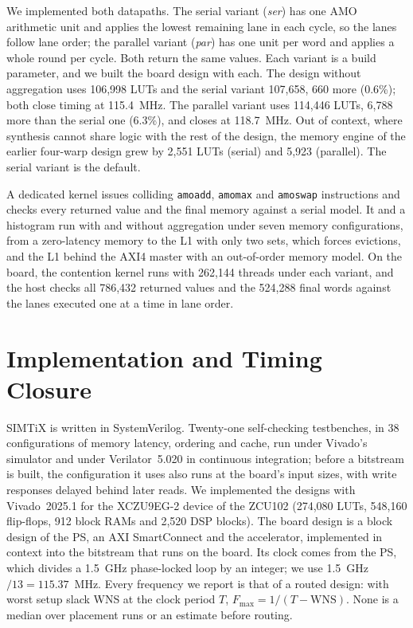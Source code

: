 \documentclass[journal]{IEEEtran}
\newcommand{\Fmax}{$F_{\max}$}
\begin{document}
We implemented both datapaths. The serial variant (\emph{ser}) has one AMO
arithmetic unit and applies the lowest remaining lane in each cycle, so the lanes
follow lane order; the parallel variant (\emph{par}) has one unit per word and
applies a whole round per cycle. Both return the same values. Each variant is a
build parameter, and we built the board design with each. The design without
aggregation uses 106,998 LUTs and the serial variant 107,658, 660 more (0.6\%);
both close timing at 115.4~MHz. The parallel variant uses 114,446 LUTs, 6,788
more than the serial one (6.3\%), and closes at 118.7~MHz. Out of context, where synthesis cannot share logic with the rest of
the design, the memory engine of the earlier four-warp design grew by 2,551 LUTs
(serial) and 5,923 (parallel). The serial variant is the default.

A dedicated kernel issues colliding \texttt{amoadd}, \texttt{amomax} and
\texttt{amoswap} instructions and checks every returned value and the final memory
against a serial model. It and a histogram run with and without aggregation under
seven memory configurations, from a zero-latency memory to the L1 with only two
sets, which forces evictions, and the L1 behind the AXI4 master with an
out-of-order memory model. On the board, the contention kernel runs with 262,144
threads under each variant, and the host checks all 786,432 returned values and
the 524,288 final words against the lanes executed one at a time in lane order.

\section{Implementation and Timing Closure}\label{sec:impl}
SIMTiX is written in SystemVerilog. Twenty-one self-checking testbenches, in 38
configurations of memory latency, ordering and cache, run under Vivado's simulator
and under Verilator~5.020 in continuous integration; before a bitstream is built,
the configuration it uses also runs at the board's input sizes, with write
responses delayed behind later reads. We implemented the designs with
Vivado~2025.1 for the XCZU9EG-2 device of the ZCU102 (274,080 LUTs, 548,160
flip-flops, 912 block RAMs and 2,520 DSP blocks). The board design is a block
design of the PS, an AXI SmartConnect and the accelerator, implemented in context
into the bitstream that runs on the board. Its clock comes from the PS, which
divides a 1.5~GHz phase-locked loop by an integer; we use 1.5~GHz$/13 =
115.37$~MHz. Every frequency we report is that of a routed design: with worst
setup slack WNS at the clock period $T$, \Fmax${}=1/(T-\mathrm{WNS})$. None is a
median over placement runs or an estimate before routing.
\end{document}
